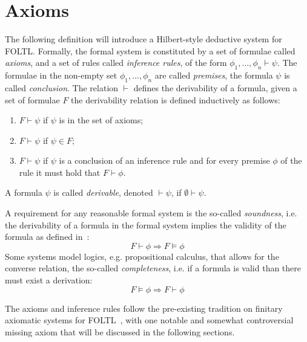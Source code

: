 \section{Axioms}

The following definition will introduce a Hilbert-style deductive system for \ac{FOLTL}. Formally, the formal system is
constituted by a set of formulae called \emph{axioms}, and a set of rules called \emph{inference rules}, of the form
$\phi_1, \ldots, \phi_n \vdash \psi$. The formulae in the non-empty set $\phi_1, \ldots, \phi_n$ are called
\emph{premises}, the formula $\psi$ is called \emph{conclusion}. The relation $\vdash$ defines the derivability of a
formula, given a set of formulae $F$ the derivability relation is defined inductively as follows:
\begin{enumerate}
  \item $F \vdash \psi$ if $\psi$ is in the set of axioms;
  \item $F \vdash \psi$ if $\psi \in F$;
  \item $F \vdash \psi$ if $\psi$ is a conclusion of an inference rule and for every premise $\phi$ of the rule it must
    hold that $F \vdash \phi$.
\end{enumerate}
A formula $\psi$ is called \emph{derivable}, denoted $\vdash \psi$, if $\emptyset \vdash \psi$.

A requirement for any reasonable formal system is the so-called \emph{soundness}, i.e. the derivability of a formula in
the formal system implies the validity of the formula as defined in~:
\[
  F \vdash \phi \Rightarrow F \vDash \phi
\]
Some systems model logics, e.g. propositional calculus, that allows for the converse relation, the so-called \emph{completeness}, i.e. if a formula is valid than there must exist a derivation:
\[
  F \vDash \phi \Rightarrow F \vdash \phi
\]

The axioms and inference rules follow the pre-existing tradition on finitary axiomatic systems for
\ac{FOLTL}~\cite{burgess_axioms_1982,xu_us-tense_1988}, with one notable and somewhat controversial missing axiom that
will be discussed in the following sections.

